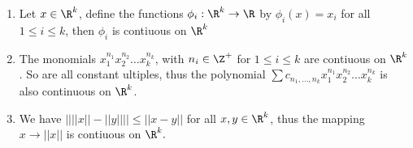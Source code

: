 \begin{example}
    \begin{enumerate}[label=(\arabic*)]
        \item Let $x \in \R^k$, define the functions  $\phi_i:\R^k \rightarrow \R$ by 
            $\phi_i(x)=x_i$ for all  $1 \leq i \leq k$, then  $\phi_i$ is contiuous on  $\R^k$ 

        \item The monomials  $x_1^{n_1}x_2^{n_2} \dots x_k^{n_k}$, with $n_i \in \Z^+$ for 
             $1 \leq i \leq k$ are contiuous on  $\R^k$. So are all constant ultiples, thus the 
             polynomial  $\sum{c_{n_1, \dots, n_k}}x_1^{n_1}x_2^{n_2} \dots x_k^{n_k}$ is also 
             continuous on $\R^k$.

         \item We have  $||||x||-||y|||| \leq ||x-y||$ for all  $x,y \in \R^k$, thus the 
             mapping  $x \rightarrow ||x||$ is contiuous on $\R^k.$
    \end{enumerate}		
\end{example}
